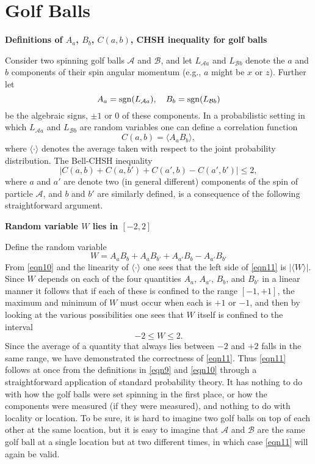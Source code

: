 \documentclass[12pt]{article} %
\def\outl#1{\par{\medskip\noindent\hspace*{.5cm}\bf
      \mathversion{bold}#1\mathversion{normal}\smallskip} }
\def\np{} \def\xa{} \def\xb{} \def\xn{} \def\xp{}
\def\outl#1{} \def\np{} \def\xa{} \def\xb{} \def\xn{} \def\xp{}
\def\outl#1{\par{\medskip\noindent\hspace*{.5cm}\bf
      \mathversion{bold}#1\mathversion{normal}\smallskip} }
\def\np{\newpage }\def\xn{\nopagebreak }\def\xp{\pagebreak }
\newcommand{\avg}[1]{\langle #1\rangle }
\newcommand{\sgn}{\mathop{\rm sgn}}
\newcommand{\AM}{{\mathcal A}}
\newcommand{\BM}{{\mathcal B}}
\begin{document}
\xb
\section{Golf Balls}
\label{sct4}
\xa

\xb
\outl{Definitions of $A_a$, $B_b$, $C(a,b)$, CHSH inequality for golf balls}
\xa



Consider two spinning golf balls $\AM$ and $\BM$, and let $L_{\AM a}$ and
$L_{\BM b}$
denote the $a$ and $b$ components of their spin angular momentum (e.g., 
$a$ might be $x$ or $z$). Further let
\begin{equation}
  A_a = \sgn(L_{\AM a}),\quad  B_b = \sgn(L_{\BM b})
\label{eqn9}
\end{equation}
be the algebraic signs, $\pm1$ or $0$ of these components.  In a probabilistic
setting in which $L_{\AM a}$ and $L_{\BM b}$ are random variables one can
define a correlation function
\begin{equation}
  C(a,b) = \avg{A_a B_b},
\label{eqn10}
\end{equation}
where $\avg{\cdot}$ denotes the average taken with respect to the joint
probability distribution.  The Bell-CHSH inequality \cite{CHSH69,Bll81,Bll90b}
\begin{equation}
  |C(a,b) + C(a,b') + C(a',b) - C(a',b')| \leq 2,
\label{eqn11}
\end{equation}
where $a$ and $a'$ are denote two (in general different) components of the
spin of particle $\AM$, and $b$ and $b'$ are similarly defined,
is a consequence of the following straightforward argument.

\xb
\outl{Random variable $W$ lies in $[-2,2]$}
\xa


Define the random variable
\begin{equation}
  W = A_a B_b +A_a B_{b'} +A_{a'} B_b -A_{a'} B_{b'}
\label{eqn12}
\end{equation}
From \eqref{eqn10} and the linearity of $\avg{\cdot}$ one sees that the left
side of \eqref{eqn11} is $|\avg{W}|$.  Since $W$ depends on each of the four
quantities $A_a$, $A_{a'}$, $B_b$, and $B_{b'}$ in a linear manner it follows
that if each of these is confined to the range $[-1,+1]$, the maximum and
minimum of $W$ must occur when each is $+1$ or $-1$, and then by looking at
the various possibilities one sees that $W$ itself is confined to the interval
\begin{equation}
  -2\leq W\leq 2.
\label{eqn13}
\end{equation}
Since the
average of a quantity that always lies between $-2$ and $+2$
falls in the same range, we have demonstrated the correctness of \eqref{eqn11}.
%
Thus \eqref{eqn11} follows at once from the definitions in
\eqref{eqn9} and \eqref{eqn10} through a straightforward application of
standard probability theory.  It has nothing to do with how the golf balls
were set spinning in the first place, or how the components were measured (if
they were measured), and nothing to do with locality or location.  To be sure,
it is hard to imagine two golf balls on top of each other at the same
location, but it is easy to imagine that $\AM$ and $\BM$ are the same golf
ball at a single location but at two different times, in which case
\eqref{eqn11} will again be valid.
\end{document}
